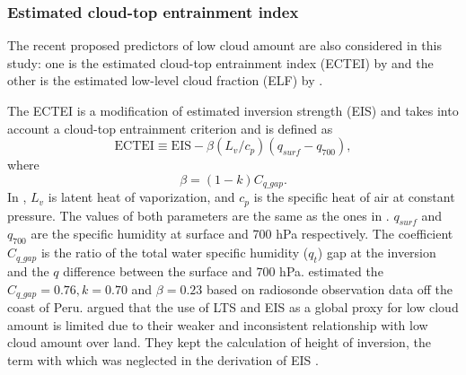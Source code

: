 \subsubsection{Estimated cloud-top entrainment index}

The recent proposed predictors of low cloud amount are also considered in this study: one is the estimated cloud-top entrainment index (ECTEI) by \cite{Kawai2017} and the other is the estimated low-level cloud fraction (ELF) by \cite{Park2019}. 

The ECTEI is a modification of estimated inversion strength (EIS) and takes into account a cloud-top entrainment criterion and is defined as
\begin{equation}
    \mathrm{ECTEI} \equiv \mathrm{EIS} - \beta\left(L_v / c_{p}\right)\left(q_{surf}-q_{700}\right),
    \label{eq:ectei_Kawai}
\end{equation}
where
\begin{equation}
    \beta=(1-k) C_{q\_gap}.
\end{equation}
In , $L_v$ is latent heat of vaporization, and $c_p$ is the specific heat of air at constant pressure. The values of both parameters are the same as the ones in  . $q_{surf}$ and $q_{700}$ are the specific humidity at surface and 700 hPa respectively. The coefficient $C_{q\_gap}$ is the ratio of the total water specific humidity ($q_t$) gap at
the inversion and the $q$ difference between the surface
and 700 hPa. \cite{Kawai2017} estimated the $C_{q\_gap} = 0.76, k=0.70 $ and $\beta = 0.23$ based on radiosonde observation data off the coast of Peru. 
\cite{Park2019} argued that the use of LTS and EIS as a global proxy for low cloud amount is limited
due to their weaker and inconsistent relationship with low cloud amount over land. They kept the calculation of height of inversion, the term with which was neglected in the derivation of EIS \citep{Wood2006}. 